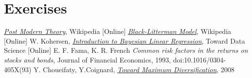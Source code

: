 \section*{Exercises}


\begin{thebibliography}{9}
\href{https://en.wikipedia.org/wiki/Post-modern_portfolio_theory}{\emph{Post Modern Theory}}, Wikipedia [Online]
\href{https://en.wikipedia.org/wiki/Black\%E2\%80\%93Litterman_model}{\emph{Black-Litterman Model}}, Wikipedia [Online]
W. Kohersen, \href{https://towardsdatascience.com/introduction-to-bayesian-linear-regression-e66e60791ea7}{\emph{Introduction to Bayesian Linear Regression}}, Toward Data Science [Online]
 E. F. Fama, K. R. French \emph{Common risk factors in the returns on stocks and bonds}, Journal of Financial Economics, 1993, doi:10.1016/0304-405X(93)
 Y. Choueifaty, Y.Coignard, \href{ https://www.tobam.fr/wp-content/uploads/2014/12/TOBAM-JoPM-Maximum-Div-2008.pdf}{\emph{Toward Maximum Diversification}}, 2008
\end{thebibliography}
